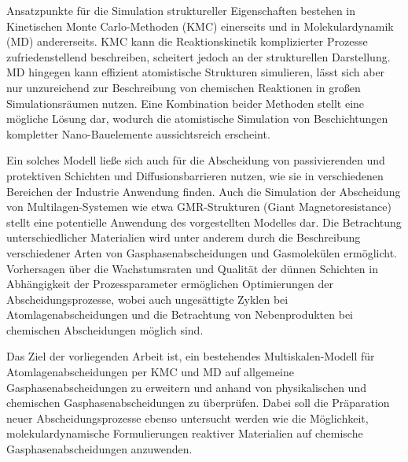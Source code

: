 
Ansatzpunkte für die Simulation struktureller Eigenschaften bestehen in Kinetischen Monte Carlo-Methoden (KMC) einerseits und in Molekulardynamik (MD) andererseits.
KMC kann die Reaktionskinetik komplizierter Prozesse zufriedenstellend beschreiben, scheitert jedoch an der strukturellen Darstellung.
MD hingegen kann effizient atomistische Strukturen simulieren, lässt sich aber nur unzureichend zur Beschreibung von chemischen Reaktionen in großen Simulationsräumen nutzen.
Eine Kombination beider Methoden stellt eine mögliche Lösung dar, wodurch die atomistische Simulation von Beschichtungen kompletter Nano-Bauelemente aussichtsreich erscheint.


Ein solches Modell ließe sich auch für die Abscheidung von passivierenden und protektiven Schichten und Diffusionsbarrieren nutzen, wie sie in verschiedenen Bereichen der Industrie Anwendung finden.
Auch die Simulation der Abscheidung von Multilagen-Systemen wie etwa GMR-Strukturen (Giant Magnetoresistance) stellt eine potentielle Anwendung des vorgestellten Modelles dar.
Die Betrachtung unterschiedlicher Materialien wird unter anderem durch die Beschreibung verschiedener Arten von Gasphasenabscheidungen und Gasmolekülen ermöglicht.
Vorhersagen über die Wachstumsraten und Qualität der dünnen Schichten in Abhängigkeit der Prozessparameter ermöglichen Optimierungen der Abscheidungsprozesse, wobei auch ungesättigte Zyklen bei Atomlagenabscheidungen und die Betrachtung von Nebenprodukten bei chemischen Abscheidungen möglich sind.


Das Ziel der vorliegenden Arbeit ist, ein bestehendes Multiskalen-Modell für Atomlagenabscheidungen per KMC und MD auf allgemeine Gasphasenabscheidungen zu erweitern und anhand von physikalischen und chemischen Gasphasenabscheidungen zu überprüfen.
Dabei soll die Präparation neuer Abscheidungsprozesse ebenso untersucht werden wie die Möglichkeit, molekulardynamische Formulierungen reaktiver Materialien auf chemische Gasphasenabscheidungen anzuwenden.


